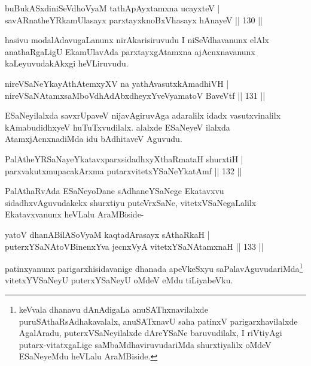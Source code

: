 \begin{shl}
buBukASxdiniSeVdhoV\s yaM tathA\s pAyxtamxna ucayxteV |\\
savARnatheYRkamUlasayx parxtayxknoBxVhasayx hAnayeV \hfill || 130 ||
\end{shl}

\begin{artha}
hasivu modalAdavugaLanunx nirAkarisiruvudu I niSeVdhavanunx elAlx anathaRgaLigU EkamUlavAda parxtayxgAtamxna ajAcnxnavanunx kaLeyuvudakAkxgi heVLiruvudu.
\end{artha}

\begin{shl}
nireVSaNeYkayAthAtemxyXV na yathAvasutxkAmadhiVH |\\
nireVSaNAtamxsaMboVdhAdAbxdheyxYveVyamatoV BaveVtf \hfill || 131 ||
\end{shl}

\begin{artha}
ESaNeyilalxda savxrUpaveV nijavAgiruvAga adaralilx idadx vasutxvinalilx kAmabudidhxyeV huTuTxvudilalx. alalxde ESaNeyeV ilalxda AtamxjAcnxnadiMda idu bAdhitaveV Aguvudu.
\end{artha}

\begin{shl}
PalAtheYRSaNayeYkatavxparxsidadhxyXthaRmataH shurxtiH |\\
parxvakutxmupacakArxma putarxvitetxYSaNeYkatAmf \hfill || 132 ||
\end{shl}

\begin{artha}
PalAthaRvAda ESaNeyoDane sAdhaneYSaNege Ekatavxvu sidadhxvAguvudakekx shurxtiyu puteVrxSaNe, vitetxVSaNegaLalilx Ekatavxvanunx heVLalu AraMBiside-
\end{artha}


\begin{shl}
yatoV dhanABilASoV\s yaM kaqtadArasayx sAthaRkaH |\\
puterxYSaNA\s toV\s BinenxYva jecnxVyA vitetxYSaNAtamxnaH \hfill || 133 ||
\end{shl}

\begin{artha}
patinxyanunx parigarxhisidavanige dhanada apeVkeSxyu saPalavAguvudariMda\footnote[1]{keVvala dhanavu dAnAdigaLa anuSAThxnavilalxde puruSAthaRsAdhakavalalx, anuSATxnavU saha patinxV parigarxhavilalxde AgalAradu, puterxVSaNeyilalxde dAreYSaNe baruvudilalx, I riVtiyAgi putarx-vitatxgaLige saMbaMdhaviruvudariMda shurxtiyalilx oMdeV ESaNeyeMdu heVLalu AraMBiside.} vitetxYVSaNeyU puterxYSaNeyU oMdeV eMdu tiLiyabeVku.
\end{artha}

